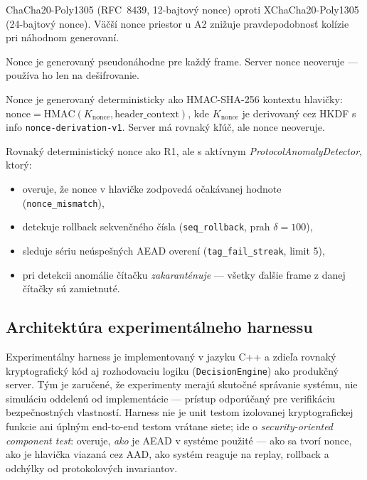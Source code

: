\begin{description}[leftmargin=*,itemsep=2pt]
  \item[Algoritmus (A1 vs.\ A2):] ChaCha20-Poly1305 (RFC~8439\cite{RFC8439}, 12-bajtový nonce) oproti XChaCha20-Poly1305\cite{XChaChaDraft} (24-bajtový nonce). Väčší nonce priestor u A2 znižuje pravdepodobnosť kolízie pri náhodnom generovaní.
  \item[Režim nonce (R0):] Nonce je generovaný pseudonáhodne pre každý frame. Server nonce neoveruje --- používa ho len na dešifrovanie.
  \item[Režim nonce (R1):] Nonce je generovaný deterministicky ako HMAC-SHA-256 kontextu hlavičky:
  $\text{nonce} = \text{HMAC}(K_{\text{nonce}}, \text{header\_context})$,
  kde $K_{\text{nonce}}$ je derivovaný cez HKDF s info \texttt{nonce-derivation-v1}. Server má rovnaký kľúč, ale nonce neoveruje.
  \item[Režim nonce (R2):] Rovnaký deterministický nonce ako R1, ale s aktívnym \emph{ProtocolAnomalyDetector}, ktorý:
  \begin{itemize}[itemsep=1pt]
    \item overuje, že nonce v hlavičke zodpovedá očakávanej hodnote (\texttt{nonce\_mismatch}),
    \item detekuje rollback sekvenčného čísla (\texttt{seq\_rollback}, prah $\delta = 100$),
    \item sleduje sériu neúspešných AEAD overení (\texttt{tag\_fail\_streak}, limit 5),
    \item pri detekcii anomálie čítačku \emph{zakaranténuje} --- všetky ďalšie frame z danej čítačky sú zamietnuté.
  \end{itemize}
\end{description}

\subsection{Architektúra experimentálneho harnessu}
\label{sec:harness}

Experimentálny harness je implementovaný v jazyku C++ a zdieľa rovnaký kryptografický kód aj rozhodovaciu logiku (\texttt{DecisionEngine}) ako produkčný server. Tým je zaručené, že experimenty merajú skutočné správanie systému, nie simuláciu oddelenú od implementácie --- prístup odporúčaný pre verifikáciu bezpečnostných vlastností\cite{NIST80053}. Harness nie je unit testom izolovanej kryptografickej funkcie ani úplným end-to-end testom vrátane siete; ide o \emph{security-oriented component test}: overuje, \emph{ako} je AEAD v systéme použité --- ako sa tvorí nonce, ako je hlavička viazaná cez AAD, ako systém reaguje na replay, rollback a odchýlky od protokolových invariantov.

